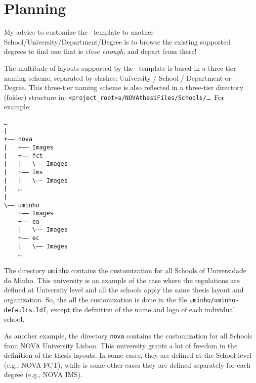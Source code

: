 
%

\chapter{Planning}
\label{cha:Planning}

My advice to customize the \novathesis\ template to another School/University/Department/Degree is to browse the existing supported degrees to find one that is \emph{close enough}, and depart from there!

The multitude of layouts supported by the \novathesis\ template is based in a three-tier naming scheme, separated by slashes: University / School / Department-or-Degree.  This three-tier naming scheme is also reflected in a three-tier directory (folder) structure in: \verb!<project_root>a/NOVAthesiFiles/Schools/…!.  For example:

\begin{verbatim}
…
| 
+—— nova
|   +—— Images
|   +—— fct
|   |   \—— Images
|   +—— ims
|   |   \—— Images
|   …
|   
\—— uminho
    +—— Images
    +—— ea
    |   \—— Images
    +—— ec
    |   \—— Images
    …
\end{verbatim}

The directory \verb!uminho! contains the customization for all Schools of Universidade do Minho.  This university is an example of the case where the regulations are defined at University level and all the schools apply the same thesis layout and organization.  So, the all the customization is done in the file \verb!uminho/uminho-defaults.ldf!, except the definition of the name and logo of each individual school.

As another example, the directory \verb!nova! contains the customization for all Schools from NOVA University Lisbon. This university grants a lot of freedom in the definition of the thesis layouts.  In some cases, they are defined at the School level (e.g., NOVA FCT), while is some other cases they are defined separately for each degree (e.g., NOVA IMS).




